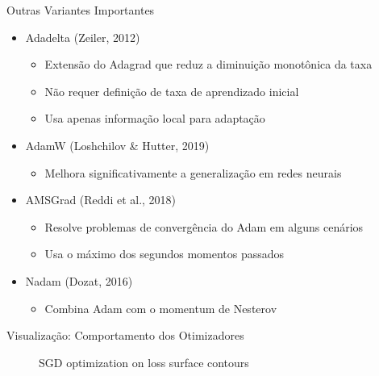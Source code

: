 \documentclass[aspectratio=1610]{beamer}
\begin{document}
\begin{frame}{Outras Variantes Importantes}
\begin{itemize}
    \item Adadelta (Zeiler, 2012) \pause
    \begin{itemize}
        \item Extensão do Adagrad que reduz a diminuição monotônica da taxa \pause
        \item Não requer definição de taxa de aprendizado inicial \pause
        \item Usa apenas informação local para adaptação
    \end{itemize} \pause
    \item AdamW (Loshchilov \& Hutter, 2019) \pause
    \begin{itemize}
        \item Melhora significativamente a generalização em redes neurais
    \end{itemize} \pause
    \item AMSGrad (Reddi et al., 2018) \pause
    \begin{itemize}
        \item Resolve problemas de convergência do Adam em alguns cenários \pause
        \item Usa o máximo dos segundos momentos passados
    \end{itemize} \pause
    \item Nadam (Dozat, 2016) \pause
    \begin{itemize}
        \item Combina Adam com o momentum de Nesterov
    \end{itemize} \pause
\end{itemize}
\end{frame}

\begin{frame}{Visualização: Comportamento dos Otimizadores}
\begin{figure}
\centering
{}
\caption{SGD optimization on loss surface contours}
\end{figure}
\end{frame}
\end{document}

